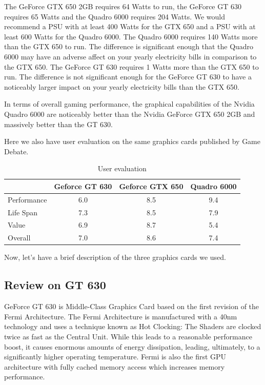 \documentclass[paper=a4, fontsize=11pt]{scrartcl}
\numberwithin{equation}{section}		%
\numberwithin{figure}{section}			%
\numberwithin{table}{section}				%
\begin{document}
The GeForce GTX 650 2GB requires 64 Watts to run, the GeForce GT 630 requires 65 Watts and the Quadro 6000 requires 204 Watts. We would recommend a PSU with at least 400 Watts for the GTX 650 and a PSU with at least 600 Watts for the Quadro 6000. The Quadro 6000 requires 140 Watts more than the GTX 650 to run. The difference is significant enough that the Quadro 6000 may have an adverse affect on your yearly electricity bills in comparison to the GTX 650. The GeForce GT 630 requires 1 Watts more than the GTX 650 to run. The difference is not significant enough for the GeForce GT 630 to have a noticeably larger impact on your yearly electricity bills than the GTX 650.

In terms of overall gaming performance, the graphical capabilities of the Nvidia Quadro 6000 are noticeably better than the Nvidia GeForce GTX 650 2GB and massively better than the GT 630.

Here we also have user evaluation on the same graphics cards published by Game Debate.

\begin{table}[!h]
\caption{User evaluation }
\centering
\begin{tabular}{|l|c|c|c|}
	\hline
	& Geforce GT 630 & Geforce GTX 650 & Quadro 6000 \\
	\hline
      Performance & 6.0 & 8.5 & 9.4 \\
	\hline
    Life Span & 7.3 & 8.5 & 7.9 \\
	\hline
    Value & 6.9 & 8.7 & 5.4\\
	\hline
	Overall & 7.0 & 8.6 & 7.4 \\
	\hline

\end{tabular}
\label{User evaluation}
\end{table}

Now, let's have a brief description of the three graphics cards we used.

\subsection {Review on GT 630}
GeForce GT 630 is Middle-Class Graphics Card based on the first revision of the Fermi Architecture. The Fermi Architecture is manufactured with a 40nm technology and uses a technique known as Hot Clocking: The Shaders are clocked twice as fast as the Central Unit. While this leads to a reasonable performance boost, it causes enormous amounts of energy dissipation, leading, ultimately, to a significantly higher operating temperature.
Fermi is also the first GPU architecture with fully cached memory access which increases memory performance. 
\end{document}
